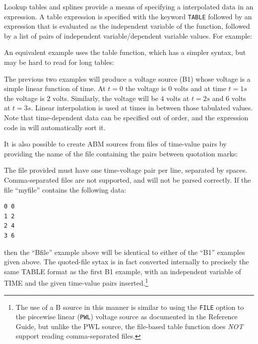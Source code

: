 Lookup tables and splines provide a means of
specifying a interpolated data in an expression.  A table expression is
specified with the keyword \verb+TABLE+ followed by an expression that
is evaluated as the independent variable of the function, followed by a
list of pairs of independent variable/dependent variable values.  For
example:


An equivalent example uses the table function, which has a simpler syntax, but
 may be hard to read for long tables:


The previous two examples will produce a voltage source (B1) whose voltage
is a simple linear function of time.  At $t=0$ the voltage is $0$ volts and 
at time $t=1s$ the voltage is $2$ volts.  Similarly, the voltage will
be $4$ volts at $t=2s$ and $6$ volts at $t=3s$. Linear interpolation is
used at times in between those tabulated values.  Note that time-dependent data can be specified out of order, and the expression code in \Xyce{} will automatically sort it.

It is also possible to create ABM sources from files of time-value pairs by providing the name of the file containing the pairs between quotation marks:


The file provided must have one time-voltage pair per line, separated
by spaces.  Comma-separated files are not supported, and will not be
parsed correctly.  If the file ``myfile'' contains the following data:
\begin{verbatim}
0 0
1 2
2 4
3 6
\end{verbatim}
then the ``Bfile'' example above will be identical to either of the
``B1'' examples given above.  The quoted-file sytax is in fact converted
internally to precisely the same TABLE format as the first B1 example,
with an independent variable of TIME and the given time-value pairs
inserted.\footnote{The use of a B source in this manner is similar to using the \texttt{FILE} option to the piecewise linear (\texttt{PWL}) voltage source as documented in the \Xyce{} Reference Guide\ReferenceGuide, but unlike the PWL source, the file-based table function does {\em NOT\/} support reading comma-separated files.}

